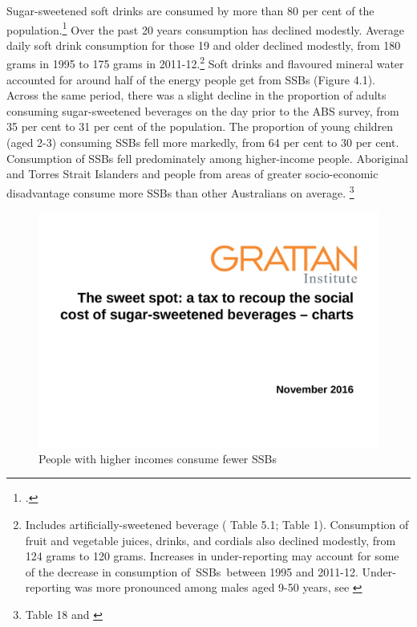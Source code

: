 \documentclass[embargoed]{grattan}
\begin{document}
Sugar-sweetened soft drinks are consumed by more than 80 per cent of the population.\footcite{Levy2014QuenchingAustraliasthirst} Over the past 20 years consumption has declined modestly. Average daily soft drink consumption for those 19 and older declined modestly, from 180 grams in 1995 to 175 grams in 2011-12.\footnote{Includes artificially-sweetened beverage (\textcite{ABS20144364055007AustralianHealth} Table 5.1; \textcite{ABS199948040NationalNutrition} Table 1). Consumption of fruit and vegetable juices, drinks, and cordials also declined modestly, from 124 grams to 120 grams. Increases in under-reporting may account for some of the decrease in consumption of~SSBs~between 1995 and 2011-12. Under-reporting was more pronounced among males aged 9-50 years, see \textcite{ABS20144364055007AustralianHealth}} %
\CenturyFootnote
Soft drinks and flavoured mineral water accounted for around half of the energy people get from SSBs (Figure 4.1).
Across the same period, there was a slight decline in the proportion of adults consuming sugar-sweetened beverages on the day prior to the ABS survey, from 35 per cent to 31 per cent of the population.
The proportion of young children (aged 2-3) consuming SSBs fell more markedly, from 64 per cent to 30 per cent.
Consumption of SSBs fell predominately among higher-income people.
Aboriginal and Torres Strait Islanders and people from areas of greater socio-economic disadvantage consume more SSBs than other Australians on average.%
\footnote{\textcite{ABS20144364055007AustralianHealth} Table 18 and \textcite{ABS199948040NationalNutrition}}

\begin{figure}
\caption{People with higher incomes consume fewer SSBs}

\includegraphics[page=8]{atlas/ObesityCharts}


\end{figure}
\end{document}
